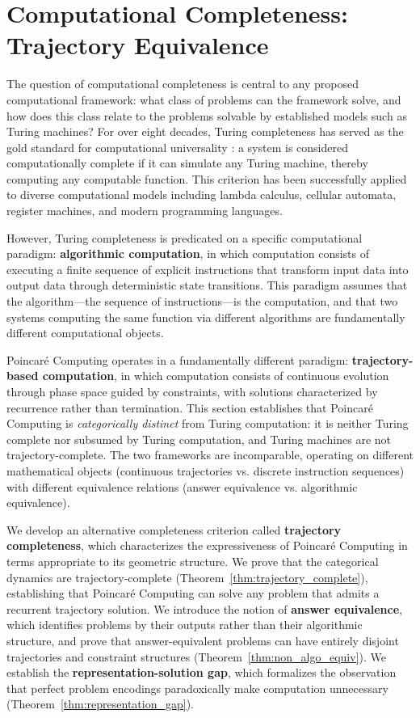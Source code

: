 \section{Computational Completeness: Trajectory Equivalence}
\label{sec:completeness}

The question of computational completeness is central to any proposed computational framework: what class of problems can the framework solve, and how does this class relate to the problems solvable by established models such as Turing machines? For over eight decades, Turing completeness has served as the gold standard for computational universality \citep{turing1936computable}: a system is considered computationally complete if it can simulate any Turing machine, thereby computing any computable function. This criterion has been successfully applied to diverse computational models including lambda calculus, cellular automata, register machines, and modern programming languages.

However, Turing completeness is predicated on a specific computational paradigm: \textbf{algorithmic computation}, in which computation consists of executing a finite sequence of explicit instructions that transform input data into output data through deterministic state transitions. This paradigm assumes that the algorithm—the sequence of instructions—is the computation, and that two systems computing the same function via different algorithms are fundamentally different computational objects.

Poincaré Computing operates in a fundamentally different paradigm: \textbf{trajectory-based computation}, in which computation consists of continuous evolution through phase space guided by constraints, with solutions characterized by recurrence rather than termination. This section establishes that Poincaré Computing is \textit{categorically distinct} from Turing computation: it is neither Turing complete nor subsumed by Turing computation, and Turing machines are not trajectory-complete. The two frameworks are incomparable, operating on different mathematical objects (continuous trajectories vs. discrete instruction sequences) with different equivalence relations (answer equivalence vs. algorithmic equivalence).

We develop an alternative completeness criterion called \textbf{trajectory completeness}, which characterizes the expressiveness of Poincaré Computing in terms appropriate to its geometric structure. We prove that the categorical dynamics are trajectory-complete (Theorem~\ref{thm:trajectory_complete}), establishing that Poincaré Computing can solve any problem that admits a recurrent trajectory solution. We introduce the notion of \textbf{answer equivalence}, which identifies problems by their outputs rather than their algorithmic structure, and prove that answer-equivalent problems can have entirely disjoint trajectories and constraint structures (Theorem~\ref{thm:non_algo_equiv}). We establish the \textbf{representation-solution gap}, which formalizes the observation that perfect problem encodings paradoxically make computation unnecessary (Theorem~\ref{thm:representation_gap}).

